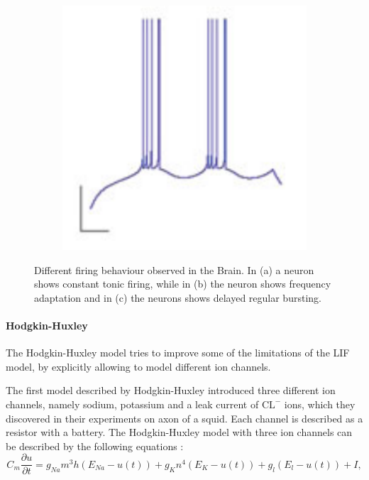 \begin{figure}
\begin{subfigure}[t]{.32\textwidth}
	\end{subfigure}
	\begin{subfigure}[t]{.32\textwidth}
	 	\centering
  		\includegraphics[width=.9\linewidth]{imgs/lif_bad3.png}
	\end{subfigure}
    \caption{Different firing behaviour observed in the Brain. In (a) a neuron shows constant tonic firing, while in (b) the neuron shows frequency adaptation and in (c) the neurons shows delayed regular bursting.}
	\label{fig:discrimation}
\end{figure}



\paragraph{Hodgkin-Huxley}

The Hodgkin-Huxley model tries to improve some of the limitations of the LIF model, by explicitly allowing to model different ion channels. 

The first model described by Hodgkin-Huxley introduced three different ion channels, namely sodium, potassium and a leak current of $\text{CL}^{-}$ ions, which they discovered in their experiments on axon of a squid.
Each channel is described as a resistor with a battery.
The Hodgkin-Huxley model with three ion channels can be described by the following equations :
\[
C_m \frac{\partial u}{\partial t} = g_{Na} m^3 h (E_{Na} - u(t)) + g_K n^4 (E_K - u(t)) + g_l (E_l - u(t)) + I,
\]

